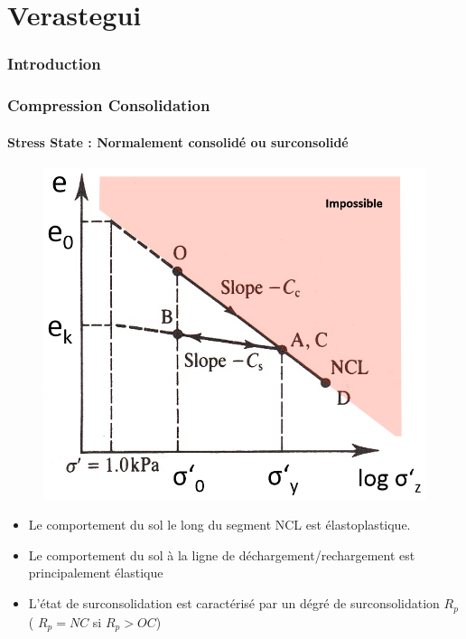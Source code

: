\part{Verastegui}

\section{Introduction}

\section{Compression Consolidation}

\subsection{Stress State : Normalement consolidé ou surconsolidé}

\begin{figure}[h]
    \center
    \includegraphics[scale=0.3]{Verastegui/images/V1.PNG}
\end{figure}

\begin{itemize}
    \item Le comportement du sol le long du segment NCL est élastoplastique.
    \item Le comportement du sol à la ligne de déchargement/rechargement est principalement élastique
    \item L'état de surconsolidation est caractérisé par un dégré de surconsolidation $R_p$ (
    $R_p =  NC$  si  $R_p > OC$)
\end{itemize}

